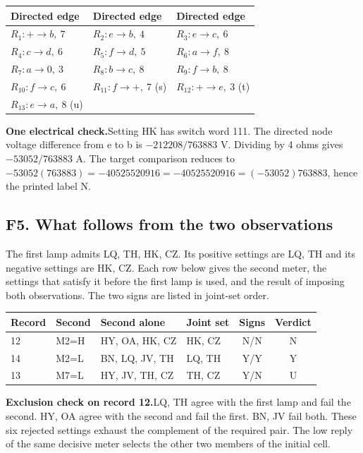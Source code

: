 \documentclass[12pt,letterpaper]{article}
\newcommand{\dossier}[2]{\clearpage\subsection*{#1}\phantomsection\label{#2}}
\newcommand{\reading}[2]{\par\smallskip\textsf{\color{accent}\bfseries #1}\enspace #2\par}
\begin{document}
\begin{center}{\footnotesize\setlength{\tabcolsep}{4pt}\begin{tabularx}{\linewidth}{@{}YYY@{}}\toprule
Directed edge & Directed edge & Directed edge\\ \midrule
$R_{1}\colon +\to b,\ 7$ & $R_{2}\colon e\to b,\ 4$ & $R_{3}\colon e\to c,\ 6$\\
$R_{4}\colon c\to d,\ 6$ & $R_{5}\colon f\to d,\ 5$ & $R_{6}\colon a\to f,\ 8$\\
$R_{7}\colon a\to 0,\ 3$ & $R_{8}\colon b\to c,\ 8$ & $R_{9}\colon f\to b,\ 8$\\
$R_{10}\colon f\to c,\ 6$ & $R_{11}\colon f\to +,\ 7$ (s) & $R_{12}\colon +\to e,\ 3$ (t)\\
$R_{13}\colon e\to a,\ 8$ (u) &  & \\ \bottomrule\end{tabularx}}
\end{center}

\reading{One electrical check.}{Setting HK has switch word 111. The directed node voltage difference from e to b is $-212208/763883$ V. Dividing by 4 ohms gives $-53052/763883$ A. The target comparison reduces to $-53052(763883)=-40525520916 = -40525520916=(-53052)763883$, hence the printed label N.}

\dossier{F5. What follows from the two observations}{pathF5}

The first lamp admits LQ, TH, HK, CZ. Its positive settings are LQ, TH and its negative settings are HK, CZ. Each row below gives the second meter, the settings that satisfy it before the first lamp is used, and the result of imposing both observations. The two signs are listed in joint-set order.

\begin{center}{\footnotesize\setlength{\tabcolsep}{4pt}\begin{tabularx}{\linewidth}{@{}llYYcc@{}}\toprule
Record & Second & Second alone & Joint set & Signs & Verdict\\  & M2=H & HY, OA, HK, CZ & HK, CZ & N/N & N\\
14 & M2=L & BN, LQ, JV, TH & LQ, TH & Y/Y & Y\\
13 & M7=L & HY, JV, TH, CZ & TH, CZ & Y/N & U\\ \bottomrule\end{tabularx}}
\end{center}

\reading{Exclusion check on record 12.}{LQ, TH agree with the first lamp and fail the second. HY, OA agree with the second and fail the first. BN, JV fail both. These six rejected settings exhaust the complement of the required pair. The low reply of the same decisive meter selects the other two members of the initial cell.}
\end{document}
